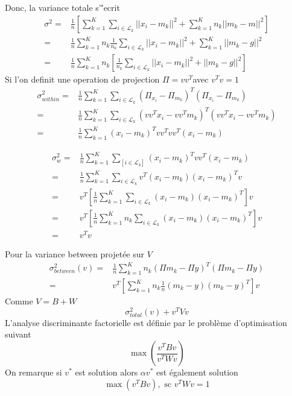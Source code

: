 \documentclass{article}
\begin{document}
Donc, la variance totale s'\''ecrit
\begin{equation}
\begin{split}
\sigma^2=&\frac{1}{n}[\sum_{k=1}^K\sum_{i\in\mathcal{L}_k}||x_i-m_k||^2+\sum_{k=1}^Kn_k||m_k-m||^2]\\
=&\frac{1}{n}\sum_{k=1}^Kn_k\frac{1}{n_k}\sum_{i\in\mathcal{L}_k}||x_i-m_k||^2+\sum_{k=1}^K||m_k-g||^2\\
=&\frac{1}{n}\sum_{k=1}^Kn_k[\frac{1}{n_k}\sum_{i\in\mathcal{L}_k}||x_i-m_k||^2+||m_k-g||^2]
\end{split}
\end{equation}
Si l'on definit une operation de projection $\Pi=vv^T$avec $v^Tv=1$
\begin{equation}
\begin{split}
	\sigma_{within}^2=&\frac{1}{n}\sum_{k=1}^K\sum_{i\in\mathcal{L}_k}(\Pi_{x_i}-\Pi_{m_k})^T(\Pi_{x_i}-\Pi_{m_k})\\
	=&\frac{1}{n}\sum_{k=1}^K\sum_{i\in\mathcal{L}_k}(vv^Tx_i-vv^Tm_k)^T(vv^Tx_i-vv^Tm_k)\\
	=&\frac{1}{n}\sum_{k=1}^K(x_i-m_k)^Tvv^Tvv^T(x_i-m_k)
\end{split}
\end{equation}

\begin{equation}
	\begin{split}
		\sigma_w^2=&\frac{1}{n}\sum_{k=1}^K\sum_[i\in\mathcal{L}_k](x_i-m_k)^Tvv^T(x_i-m_k)\\
		=&\frac{1}{n}\sum_{k=1}^K\sum_{i\in\mathcal{L}_k}v^T(x_i-m_k)(x_i-m_k)^Tv\\
		=&v^T[\frac{1}{n}\sum_{k=1}^K\sum_{i\in\mathcal{L}_k}(x_i-m_k)(x_i-m_k)^T]v\\
		=&v^T[\frac{1}{n}\sum_{k=1}^Kn_k\sum_{i\in\mathcal{L}_k}(x_i-m_k)(x_i-m_k)^T]v\\
		=&v^Tv
	\end{split}
\end{equation}

Pour la variance between projet\'ee sur $V$
\begin{equation}
\begin{split}
\sigma^2_{between}(v)=&\frac{1}{n}\sum_{k=1}^Kn_k(\Pi m_k-\Pi y)^T(\Pi m_k-\Pi y)\\
=&v^T[\sum_{k=1}^Kn_k \frac{1}{n}(m_k-y)(m_k-y)^T]v
\end{split}
\end{equation}
Comme $V=B+W$
\begin{equation}
\sigma^2_{total}(v)+v^TVv
\end{equation}
L'analyse discriminante factorielle est  d\'efinie par le probl\`eme d'optimisation suivant
\begin{equation}
\max(\frac{v^TBv}{v^TWv})
\end{equation}
On remarque si $v^*$  est solution alors $\alpha v^*$ est \'egalement solution
\begin{equation}
\max(v^TBv),\text{ sc } v^TWv=1
\end{equation}
\end{document}
